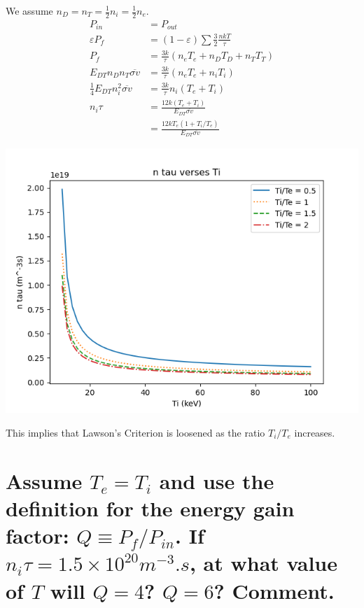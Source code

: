 \documentclass[answers]{exam}
\begin{document}
\begin{questions}
\begin{parts}
\begin{solution}
    We assume $n_D = n_T = \frac{1}{2}n_i = \frac{1}{2}n_e$.
    \begin{align*}
        P_{in} &= P_{out} \\
        \varepsilon P_f &= (1 - \varepsilon) \sum \frac{3}{2} \frac{nkT}{\tau} \\
        P_f &= \frac{3k}{\tau} \left(n_eT_e + n_DT_D + n_TT_T\right) \\
        E_{DT} n_Dn_T \overline{\sigma v} &= \frac{3k}{\tau} \left(n_eT_e + n_iT_i\right) \\
        \frac{1}{4} E_{DT} n_i^2 \overline{\sigma v} &= \frac{3k}{\tau} n_i (T_e + T_i) \\
        n_i\tau &= \frac{12k(T_e+T_i)}{E_{DT}\overline{\sigma v}} \\
                &= \frac{12kT_e(1 + T_i/T_e)}{E_{DT}\overline{\sigma v}}
    \end{align*}
    \begin{center}
        \includegraphics{q3a.png}
    \end{center}
    This implies that Lawson's Criterion is loosened as the ratio $T_i/T_e$ increases.
\end{solution}

\part{Assume $T_e = T_i$ and use the definition for the energy gain factor: $Q \equiv P_f/P_{in}$. If $n_i\tau = 1.5 \times 10^{20} \unit{m^{-3}.s}$, at what value of $T$ will $Q = 4$? $Q = 6$? Comment.}


\end{parts}
\end{questions}
\end{document}
